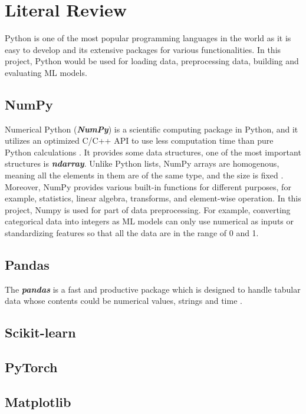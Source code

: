 \documentclass[12pt,twoside]{report}
\begin{document}
\chapter{Literal Review}
Python is one of the most popular programming languages in the world as it is easy to develop and its extensive packages for various functionalities. In this project, Python would be used for loading data, preprocessing data, building and evaluating ML models. 

\section{NumPy}
Numerical Python (\textit{\textbf{NumPy}}) is a scientific computing package in Python, and it utilizes an optimized C/C++ API to use less computation time than pure Python calculations \citep{RN6}. It provides some data structures, one of the most important structures is \textbf{\emph{ndarray}}. Unlike Python lists, NumPy arrays are homogenous, meaning all the elements in them are of the same type, and the size is fixed \citep{RN4}.  Moreover, NumPy provides various built-in functions for different purposes, for example, statistics, linear algebra,  transforms, and element-wise operation. In this project, Numpy is used for part of data preprocessing. For example, converting categorical data into integers as ML models can only use numerical as inputs or standardizing features so that all the data are in the range of 0 and 1. 

\section{Pandas}
The \textbf{\textit{pandas}} is a fast and productive package which is designed to handle tabular data whose contents could be numerical values, strings and time \citep{RN4}.  

\section{Scikit-learn}

\section{PyTorch}

\section{Matplotlib}
\end{document}
